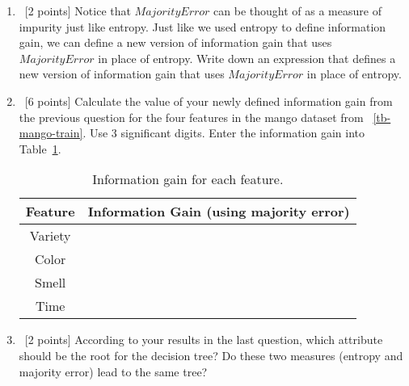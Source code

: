 \begin{enumerate}
  \begin{enumerate}
  \item~[2 points]   Notice that $MajorityError$ can be thought of as a measure of impurity just like entropy. Just like we used entropy to define information gain, we can define a new version of information gain that uses $MajorityError$ in place of entropy. Write down an expression that defines a new version of information gain that uses $MajorityError$ in place of entropy.

  \item~[6 points] Calculate the value of your newly defined information gain from the previous question for the four features in the mango dataset from ~\ref{tb-mango-train}. Use 3 significant digits. Enter the information gain into Table~\ref{tb-maj-ig}.

    \begin{table}[h!]
      \centering
      \begin{tabular}{c|c}
        \hline
        Feature & Information Gain (using majority error) \\ \hline
        Variety &                  \\
        Color   &                  \\
        Smell   &                  \\
        Time    &                  \\ \hline
      \end{tabular}
      \caption{Information gain for each feature.}\label{tb-maj-ig}
    \end{table}

  \item~[2 points] According to your results in the last question, which
    attribute should be the root for the decision tree?  Do these two measures
    (entropy and majority error) lead to the same tree?
  \end{enumerate}

\end{enumerate}



